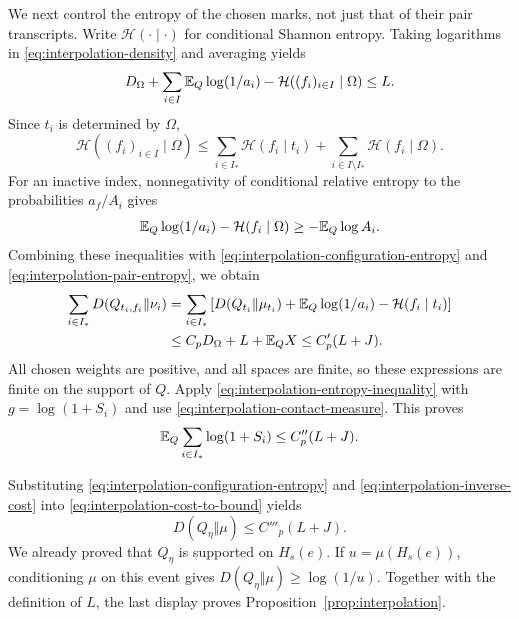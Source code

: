 We next control the entropy of the chosen marks, not just that of their
pair transcripts. Write $\mathcal H(\cdot\mid\cdot)$ for conditional
Shannon entropy. Taking logarithms in
\eqref{eq:interpolation-density} and averaging yields
\begin{equation}\label{eq:interpolation-joint-contact-cost}
 D_\Omega+\sum_{i\in I}\mathbb E_Q\log(1/a_i)
       -\mathcal H((f_i)_{i\in I}\mid\Omega)\le L.
\end{equation}
Since $t_i$ is determined by $\Omega$,
\[
 \mathcal H((f_i)_{i\in I}\mid\Omega)
 \le\sum_{i\in I_*}\mathcal H(f_i\mid t_i)
    +\sum_{i\in I\setminus I_*}\mathcal H(f_i\mid\Omega).
\]
For an inactive index, nonnegativity of conditional relative entropy
to the probabilities $a_f/A_i$ gives
\[
 \mathbb E_Q\log(1/a_i)-\mathcal H(f_i\mid\Omega)
 \ge-\mathbb E_Q\log A_i.
\]
Combining these inequalities with
\eqref{eq:interpolation-configuration-entropy} and
\eqref{eq:interpolation-pair-entropy}, we obtain
\begin{align*}
 \sum_{i\in I_*}D(Q_{t_i,f_i}\Vert\nu_i)
 &=\sum_{i\in I_*}\left[
 D(Q_{t_i}\Vert\mu_{t_i})+
 \mathbb E_Q\log(1/a_i)-\mathcal H(f_i\mid t_i)\right]\\
 &\le C_pD_\Omega+L+\mathbb E_Q X
 \le C'_p(L+J).
\end{align*}
All chosen weights are positive, and all spaces are finite, so these
expressions are finite on the support of $Q$.
Apply \eqref{eq:interpolation-entropy-inequality} with
$g=\log(1+S_i)$ and use
\eqref{eq:interpolation-contact-measure}. This proves
\begin{equation}\label{eq:interpolation-inverse-cost}
 \mathbb E_Q\sum_{i\in I_*}\log(1+S_i)\le C''_p(L+J).
\end{equation}

Substituting \eqref{eq:interpolation-configuration-entropy} and
\eqref{eq:interpolation-inverse-cost} into
\eqref{eq:interpolation-cost-to-bound} yields
\begin{equation}\label{eq:interpolation-output-entropy}
 D(Q_\eta\Vert\mu)\le C'''_p(L+J).
\end{equation}
We already proved that $Q_\eta$ is supported on $H_s(e)$. If
$u=\mu(H_s(e))$, conditioning $\mu$ on this event gives
$D(Q_\eta\Vert\mu)\ge\log(1/u)$.
Together with the definition of $L$, the last display proves
Proposition~\ref{prop:interpolation}.
